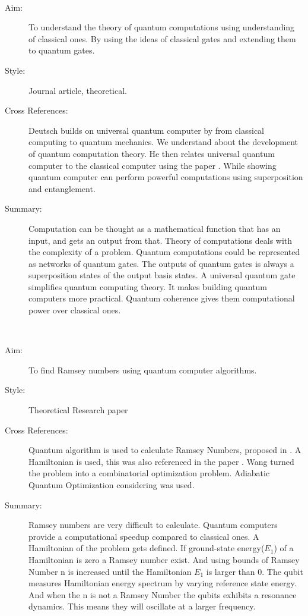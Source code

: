 \documentclass{Assignment}
\begin{document}
\newpage
\cite{Deutsch1989}~
\begin{description}
	\item [ Aim:]
	To understand the theory of quantum computations using understanding of classical ones.
	By using the ideas of classical gates and extending them to quantum gates.
	\item[Style:]
	Journal article, theoretical.
	
	\item[Cross References:]
	Deutsch builds on universal quantum computer by \cite{deutsch1985quantum} from classical computing to quantum mechanics. 
	We understand about the development of quantum computation theory.
	He then relates universal quantum computer to the classical computer using the paper \cite{Turing1936}.
	While showing quantum computer can perform powerful computations using superposition and entanglement.
	\item [Summary:]
	Computation can be thought as a mathematical function that has an input, and gets an output from that.
	Theory of computations deals with the complexity of a problem.
	Quantum computations could be represented as networks of quantum gates.
	The outputs of quantum gates is always a superposition states of the output basis states.
	A universal quantum gate simplifies quantum computing theory.
	It makes building quantum computers more practical. 
	Quantum coherence gives them computational power over classical ones.
\end{description}

\newpage
\cite{PhysRevA.93.032301}~
\begin{description}
	\item [Aim:]
	To find Ramsey numbers using quantum computer algorithms.
	\item [Style:]
	Theoretical Research paper
	\item [Cross References:]
	Quantum algorithm is used to calculate Ramsey Numbers, proposed in \cite{gaitan2012ramsey}.
	A Hamiltonian is used, this was also referenced in the paper \cite{doi:10.1137/S0097539796298637}.
	Wang turned the problem into a combinatorial optimization problem.
	Adiabatic Quantum Optimization considering \cite{farhi2000quantum} was used.
	
	\item [Summary:]
	Ramsey numbers are very difficult to calculate.
	Quantum computers provide a computational speedup compared to classical ones.
	A Hamiltonian of the problem gets defined.
	If ground-state energy($E_1$) of a Hamiltonian is zero a Ramsey number exist. 
	And using bounds of Ramsey Number n is increased until the Hamiltonian $E_1$ is larger than 0.
	The qubit measures Hamiltonian energy spectrum by varying reference state energy. 
	And when the n is not a Ramsey Number the qubits exhibits a resonance dynamics.
	This means they will oscillate at a larger frequency.
\end{description}
\end{document}
